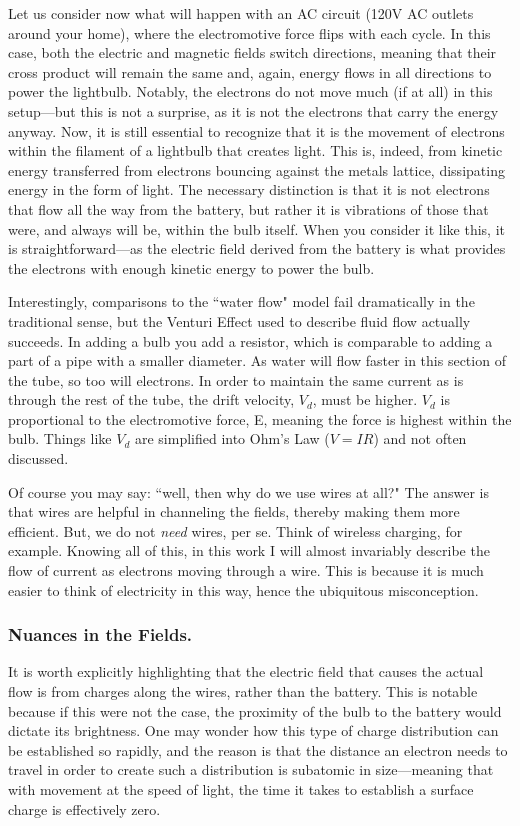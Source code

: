 Let us consider now what will happen with an AC circuit (120V AC outlets around your home), where the electromotive force flips with each cycle. In this case, both the electric and magnetic fields switch directions, meaning that their cross product will remain the same and, again, energy flows in all directions to power the lightbulb. Notably, the electrons do not move much (if at all) in this setup---but this is not a surprise, as it is not the electrons that carry the energy anyway. Now, it is still essential to recognize that it is the movement of electrons within the filament of a lightbulb that creates light. This is, indeed, from kinetic energy transferred from electrons bouncing against the metals lattice, dissipating energy in the form of light. The necessary distinction is that it is not electrons that flow all the way from the battery, but rather it is vibrations of those that were, and always will be, within the bulb itself. When you consider it like this, it is straightforward---as the electric field derived from the battery is what provides the electrons with enough kinetic energy to power the bulb.\newline

Interestingly, comparisons to the ``water flow" model fail dramatically in the traditional sense, but the Venturi Effect used to describe fluid flow actually succeeds. In adding a bulb you add a resistor, which is comparable to adding a part of a pipe with a smaller diameter. As water will flow faster in this section of the tube, so too will electrons. In order to maintain the same current as is through the rest of the tube, the drift velocity, $V_d$, must be higher. $V_d$ is proportional to the electromotive force, E, meaning the force is highest within the bulb. Things like $V_d$ are simplified into Ohm's Law ($V = IR$) and not often discussed.\newline 

Of course you may say: ``well, then why do we use wires at all?" The answer is that wires are helpful in channeling the fields, thereby making them more efficient. But, we do not \textit{need} wires, per se. Think of wireless charging, for example. Knowing all of this, in this work I will almost invariably describe the flow of current as electrons moving through a wire. This is because it is much easier to think of electricity in this way, hence the ubiquitous misconception. 

\subsubsection{Nuances in the Fields.} It is worth explicitly highlighting that the electric field that causes the actual flow is from charges along the wires, rather than the battery. This is notable because if this were not the case, the proximity of the bulb to the battery would dictate its brightness. One may wonder how this type of charge distribution can be established so rapidly, and the reason is that the distance an electron needs to travel in order to create such a distribution is subatomic in size---meaning that with movement at the speed of light, the time it takes to establish a surface charge is effectively zero.\newline

